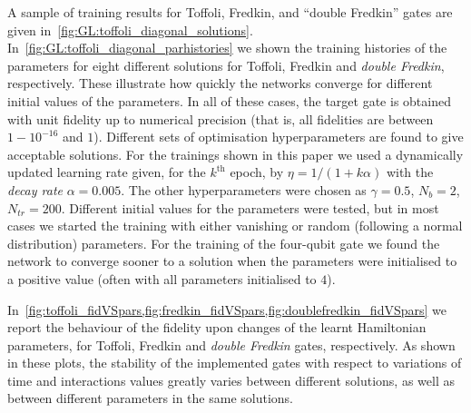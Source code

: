 A sample of training results for Toffoli, Fredkin, and ``double Fredkin'' gates are given in~\cref{fig:GL:toffoli_diagonal_solutions}.
In~\cref{fig:GL:toffoli_diagonal_parhistories} we shown the training histories of the parameters for eight different solutions for Toffoli, Fredkin and \emph{double Fredkin}, respectively.
These illustrate how quickly the networks converge for different initial values of the parameters.
In all of these cases, the target gate is obtained with unit fidelity up to numerical precision (that is, all fidelities are between $1-10^{-16}$ and $1$).
Different sets of optimisation hyperparameters are found to give acceptable solutions.
For the trainings shown in this paper we used a dynamically updated learning rate given, for the $k^{\text{th}}$ epoch, by $\eta=1/(1 + k \alpha)$ with the \emph{decay rate} $\alpha=0.005$.
The other hyperparameters were chosen as
$\gamma=0.5$, 
$N_b = 2$, $N_{tr} = 200$.
Different initial values for the parameters were tested, but in most cases we started the training with either vanishing or random (following a normal distribution) parameters.
For the training of the four-qubit gate we found the network to converge sooner to a solution when the parameters were initialised to a positive value (often with all parameters initialised to $4$).

In~\cref{fig:toffoli_fidVSpars,fig:fredkin_fidVSpars,fig:doublefredkin_fidVSpars} we report the behaviour of the fidelity upon changes of the learnt Hamiltonian parameters, for Toffoli, Fredkin and \emph{double Fredkin} gates, respectively.
As shown in these plots, the stability of the implemented gates with respect to variations of time and interactions values greatly varies between different solutions, as well as between different parameters in the same solutions.

